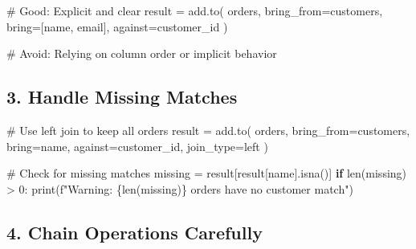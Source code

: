 \documentclass[
  letterpaper,
]{scrbook}
\newenvironment{Shaded}{\begin{snugshade}}{\end{snugshade}}
\newcommand{\BuiltInTok}[1]{\textcolor[rgb]{0.00,0.23,0.31}{#1}}
\newcommand{\CommentTok}[1]{\textcolor[rgb]{0.37,0.37,0.37}{#1}}
\newcommand{\ControlFlowTok}[1]{\textcolor[rgb]{0.00,0.23,0.31}{\textbf{#1}}}
\newcommand{\DecValTok}[1]{\textcolor[rgb]{0.68,0.00,0.00}{#1}}
\newcommand{\NormalTok}[1]{\textcolor[rgb]{0.00,0.23,0.31}{#1}}
\newcommand{\OperatorTok}[1]{\textcolor[rgb]{0.37,0.37,0.37}{#1}}
\newcommand{\SpecialCharTok}[1]{\textcolor[rgb]{0.37,0.37,0.37}{#1}}
\newcommand{\SpecialStringTok}[1]{\textcolor[rgb]{0.13,0.47,0.30}{#1}}
\newcommand{\StringTok}[1]{\textcolor[rgb]{0.13,0.47,0.30}{#1}}
\begin{document}
\begin{Shaded}
\begin{Highlighting}[]
\CommentTok{\# Good: Explicit and clear}
\NormalTok{result }\OperatorTok{=}\NormalTok{ add.to(}
\NormalTok{    orders,}
\NormalTok{    bring\_from}\OperatorTok{=}\NormalTok{customers,}
\NormalTok{    bring}\OperatorTok{=}\NormalTok{[}\StringTok{\textquotesingle{}name\textquotesingle{}}\NormalTok{, }\StringTok{\textquotesingle{}email\textquotesingle{}}\NormalTok{],}
\NormalTok{    against}\OperatorTok{=}\StringTok{\textquotesingle{}customer\_id\textquotesingle{}}
\NormalTok{)}

\CommentTok{\# Avoid: Relying on column order or implicit behavior}
\end{Highlighting}
\end{Shaded}

\subsection{3. Handle Missing Matches}\label{handle-missing-matches}

\begin{Shaded}
\begin{Highlighting}[]
\CommentTok{\# Use left join to keep all orders}
\NormalTok{result }\OperatorTok{=}\NormalTok{ add.to(}
\NormalTok{    orders,}
\NormalTok{    bring\_from}\OperatorTok{=}\NormalTok{customers,}
\NormalTok{    bring}\OperatorTok{=}\StringTok{\textquotesingle{}name\textquotesingle{}}\NormalTok{,}
\NormalTok{    against}\OperatorTok{=}\StringTok{\textquotesingle{}customer\_id\textquotesingle{}}\NormalTok{,}
\NormalTok{    join\_type}\OperatorTok{=}\StringTok{\textquotesingle{}left\textquotesingle{}}
\NormalTok{)}

\CommentTok{\# Check for missing matches}
\NormalTok{missing }\OperatorTok{=}\NormalTok{ result[result[}\StringTok{\textquotesingle{}name\textquotesingle{}}\NormalTok{].isna()]}
\ControlFlowTok{if} \BuiltInTok{len}\NormalTok{(missing) }\OperatorTok{\textgreater{}} \DecValTok{0}\NormalTok{:}
    \BuiltInTok{print}\NormalTok{(}\SpecialStringTok{f"Warning: }\SpecialCharTok{\{}\BuiltInTok{len}\NormalTok{(missing)}\SpecialCharTok{\}}\SpecialStringTok{ orders have no customer match"}\NormalTok{)}
\end{Highlighting}
\end{Shaded}

\subsection{4. Chain Operations
Carefully}\label{chain-operations-carefully}
\end{document}
